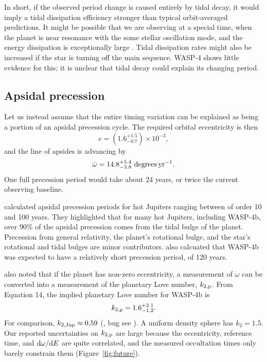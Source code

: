 \documentclass[12pt,twocolumn,tighten]{aastex62}
\begin{document}
In short, if the observed period change is caused entirely by tidal
decay, it would imply a tidal dissipation efficiency stronger than
typical orbit-averaged predictions.  It might be possible that we are
observing at a special time, when the planet is near resonance with the
some stellar oscillation mode, and the energy dissipation is
exceptionally large \citep{ogilvie_tidal_2014,essick_orbital_2016}.
Tidal dissipation rates might also be increased if the star is turning
off the main sequence.  WASP-4 shows little evidence for this; it is
unclear that tidal decay could explain its changing period.


\subsection{Apsidal precession}
\label{sec:apsidal_precession}

Let us instead assume that the entire timing variation can be explained
as being a portion of an apsidal precession cycle.  The required orbital
eccentricity is then
\begin{equation}
  e = (1.6^{+1.5}_{-0.7})\times10^{-3},
\end{equation}
and the line of apsides is advancing by
\begin{equation}
  \dot{\omega} = 14.8^{+5.4}_{-3.8}\ {\rm degrees}\,{\rm yr}^{-1}.
\end{equation}
One full precession period would take about 24 years, or twice the
current observing baseline.

\citet{ragozzine_probing_2009} calculated apsidal precession periods for
hot Jupiters ranging between of order 10 and 100 years.  They
highlighted that for many hot Jupiters, including WASP-4b, over 90\% of
the apsidal precession comes from the tidal bulge of the planet.
Precession from general relativity, the planet's rotational bulge, and
the star's rotational and tidal bulges are minor contributors.
\citet{ragozzine_probing_2009} also calcuated that WASP-4b was expected
to have a relatively short precession period, of 120 years.

\citet{ragozzine_probing_2009} also noted that if the planet has
non-zero eccentricity, a measurement of $\dot{\omega}$ can be converted
into a measurement of the planetary Love number, $k_{2,\rm p}$.
From \citet{ragozzine_probing_2009} Equation 14, the implied
planetary Love number for WASP-4b is
\begin{equation}
k_{2,{\rm p}} = 1.6^{+2.1}_{-1.2}.
\end{equation}
For comparison, $k_{2,{\rm Jup}} \approx 0.59$
(\citealt{wahl_tidal_2016}, bug see \citealt{ni_empirical_2018}).  A
uniform density sphere has $k_2 = 1.5$.  Our reported uncertainties on
$k_{2,{\rm p}}$ are large because the eccentricity, reference time, and
${\rm d}\omega/{\rm d}E$ are quite correlated, and the measured
occultation times only barely constrain them (Figure~\ref{fig:future}).
\end{document}
